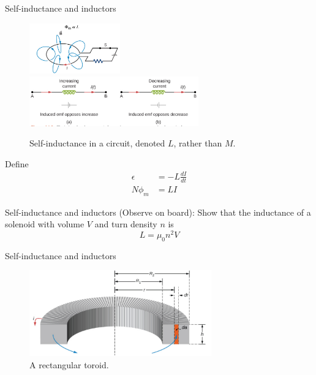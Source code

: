 \documentclass{beamer}
\begin{document}
\begin{frame}{Self-inductance and inductors}
\small
\begin{figure}
\centering
\includegraphics[width=0.35\textwidth]{figures/ind3.png} \\
\includegraphics[width=0.65\textwidth,trim=0cm 0.1cm 0cm 0cm,clip=true]{figures/ind4.png}
\caption{\label{fig:ind4} Self-inductance in a circuit, denoted $L$, rather than $M$.}
\end{figure}
Define
\begin{align}
\epsilon &= - L\frac{dI}{dt} \\
N \phi_m &= LI
\end{align}
\end{frame}

\begin{frame}{Self-inductance and inductors}
(Observe on board): Show that the inductance of a solenoid with volume $V$ and turn density $n$ is
\begin{equation}
L = \mu_0 n^2 V
\end{equation}
\end{frame}

\begin{frame}{Self-inductance and inductors}
\begin{figure}
\centering
\includegraphics[width=0.7\textwidth]{figures/ind5.png}
\caption{\label{fig:ind5} A rectangular toroid.}
\end{figure}
\end{frame}
\end{document}
